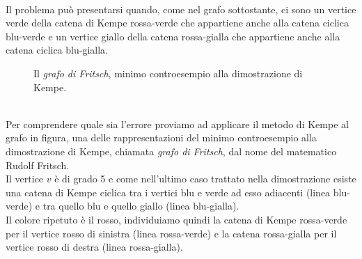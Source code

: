 \documentclass[a4paper,12pt,titlepage]{report}
\begin{document}
    \\Il problema può presentarsi quando, come nel grafo sottostante, ci sono un vertice verde della catena di Kempe rossa-verde che appartiene anche alla catena ciclica blu-verde e un vertice giallo della catena rossa-gialla che appartiene anche alla catena ciclica blu-gialla.
    \begin{figure}[h]
    	\centering
    	\vspace{0.5cm}
    	\caption{Il \emph{grafo di Fritsch}, minimo controesempio alla dimostrazione di Kempe.}
    \end{figure}
    \\Per comprendere quale sia l'errore proviamo ad applicare il metodo di Kempe al grafo in figura, una delle rappresentazioni del minimo controesempio alla dimostrazione di Kempe, chiamata \emph{grafo di Fritsch}, dal nome del matematico Rudolf Fritsch.
    \\Il vertice $v$ è di grado 5 e come nell'ultimo caso trattato nella dimostrazione esiste una catena di Kempe ciclica tra i vertici blu e verde ad esso adiacenti (linea blu-verde) e tra quello blu e quello giallo (linea blu-gialla).
    \\Il colore ripetuto è il rosso, individuiamo quindi la catena di Kempe rossa-verde per il vertice rosso di sinistra (linea rossa-verde) e la catena rossa-gialla per il vertice rosso di destra (linea rossa-gialla).
\end{document}
